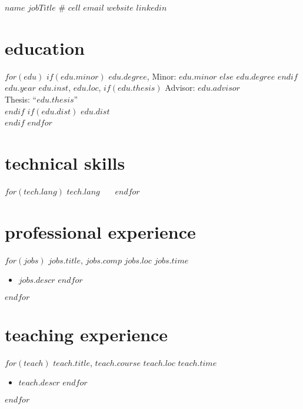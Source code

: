 \documentclass[]{friggeri-cv}
\begin{document}
\header
  {$name$}
  {$jobTitle$}
  {\# $cell$}
  {\href{mailto:$email$}{$email$}}
  {\href{$website$}{$website$}}
  {\href{$linkedin$}{$linkedin$}}



\vspace{-0.4in}
\section{education}
\begin{entrylist}
$for(edu)$
  \entrypub
  $if(edu.minor)$
    {$edu.degree$, Minor: $edu.minor$}
  $else$
    {$edu.degree$}
  $endif$
  {$edu.year$}
  {$edu.inst$, $edu.loc$, }
  $if(edu.thesis)$
    {Advisor: $edu.advisor$}\\
    {Thesis: ``$edu.thesis$''}\\
  $endif$
  $if(edu.dist)$
    {$edu.dist$}\\
  $endif$
$endfor$
\end{entrylist}



\vspace{-0.1in}
\section{technical skills}
\vspace{-0.075in}
\begin{changemargin}{0.35in}{0in}
$for(tech.lang)$
  \textbf{$tech.lang$} \, \, \,
$endfor$
\end{changemargin}



\section{professional experience}
\begin{entrylist}
$for(jobs)$
  \entryalt
  {\textit{$jobs.title$}, $jobs.comp$}
  {$jobs.loc$}
  {$jobs.time$}
  \setlength\parskip{0pt}
  \begin{itemize}[noitemsep, leftmargin=0.2in]
    $for(jobs.descr)$
      \item $jobs.descr$
    $endfor$
  \end{itemize}
  \setlength\parskip{12pt}
$endfor$
\end{entrylist}



\section{teaching experience}
\begin{entrylist}
$for(teach)$
  \entryalt
  {\textit{$teach.title$}, $teach.course$}
  {$teach.loc$}
  {$teach.time$}
  \setlength\parskip{0pt}
  \begin{itemize}[noitemsep, leftmargin=0.2in]
    $for(teach.descr)$
      \item $teach.descr$
    $endfor$
  \end{itemize}
  \setlength\parskip{12pt}
$endfor$
\end{entrylist}
\end{document}
